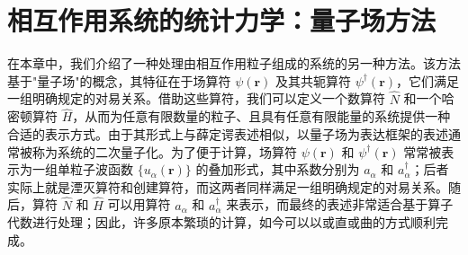 \chapter{相互作用系统的统计力学：量子场方法}\label{ux76f8ux4e92ux4f5cux7528ux7cfbux7edfux7684ux7edfux8ba1ux529bux5b66ux91cfux5b50ux573aux65b9ux6cd5}

在本章中，我们介绍了一种处理由相互作用粒子组成的系统的另一种方法。该方法基于"量子场"的概念，其特征在于场算符 \(\psi(\boldsymbol{r})\) 及其共轭算符 \(\psi^{\dagger}(\boldsymbol{r})\)，它们满足一组明确规定的对易关系。借助这些算符，我们可以定义一个数算符 \(\hat{N}\) 和一个哈密顿算符 \(\hat{H}\)，从而为任意有限数量的粒子、且具有任意有限能量的系统提供一种合适的表示方式。由于其形式上与薛定谔表述相似，以量子场为表达框架的表述通常被称为系统的二次量子化。为了便于计算，场算符 \(\psi(\boldsymbol{r})\) 和 \(\psi^{\dagger}(\boldsymbol{r})\) 常常被表示为一组单粒子波函数 \(\{u_{\alpha}(\boldsymbol{r})\}\) 的叠加形式，其中系数分别为 \(a_{\alpha}\) 和 \(a_{\alpha}^{\dagger}\)；后者实际上就是湮灭算符和创建算符，而这两者同样满足一组明确规定的对易关系。随后，算符 \(\hat{N}\) 和 \(\hat{H}\) 可以用算符 \(a_{\alpha}\) 和 \(a_{\alpha}^{\dagger}\) 来表示，而最终的表述非常适合基于算子代数进行处理；因此，许多原本繁琐的计算，如今可以以或直或曲的方式顺利完成。
